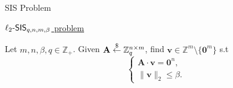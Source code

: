 \begin{frame}{SIS Problem}
	
	\underline{$\ell_2\textsf{-SIS}_{q, n, m, \beta}$ problem}
	
	Let $m, n, \beta, q \in \mathbb{Z}_+$. Given $\mathbf{A} \stackrel{\$}{\leftarrow} \mathbb{Z}_q^{n\times m}$, find $\mathbf{v} \in \mathbb{Z}^m \setminus \{\mathbf{0}^m\}$ s.t 
	\begin{equation*}
		\begin{cases}
			\mathbf{A}\cdot\mathbf{v} = \mathbf{0}^n,\\
			\lVert\mathbf{v}\rVert_2 \leq \beta.
		\end{cases}
	\end{equation*}
\end{frame}